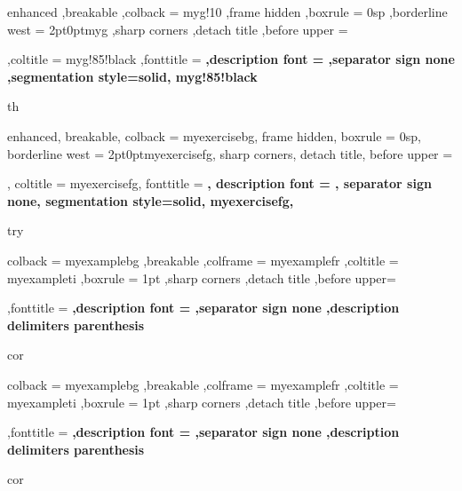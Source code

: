 
{%
	enhanced
	,breakable
	,colback = myg!10
	,frame hidden
	,boxrule = 0sp
	,borderline west = {2pt}{0pt}{myg}
	,sharp corners
	,detach title
	,before upper = \tcbtitle \par \smallskip
	,coltitle = myg!85!black
	,fonttitle = \bfseries \sffamily
	,description font = \mdseries
	,separator sign none
	,segmentation style={solid, myg!85!black}
}
{th}





{%
	enhanced,
	breakable,
	colback = myexercisebg,
	frame hidden,
	boxrule = 0sp,
	borderline west = {2pt}{0pt}{myexercisefg},
	sharp corners,
	detach title,
	before upper = \tcbtitle \par \smallskip,
	coltitle = myexercisefg,
	fonttitle = \bfseries \sffamily,
	description font = \mdseries,
	separator sign none,
	segmentation style={solid, myexercisefg},
}
{try}


 {%
 	colback = myexamplebg
 	,breakable
 	,colframe = myexamplefr
 	,coltitle = myexampleti
 	,boxrule = 1pt
 	,sharp corners
 	,detach title
 	,before upper=\tcbtitle \par \smallskip
 	,fonttitle = \bfseries
 	,description font = \mdseries
 	,separator sign none
 	,description delimiters parenthesis
 }
 {cor}

{%
	colback = myexamplebg
	,breakable
	,colframe = myexamplefr
	,coltitle = myexampleti
	,boxrule = 1pt
	,sharp corners
	,detach title
	,before upper=\tcbtitle \par \smallskip
	,fonttitle = \bfseries
	,description font = \mdseries
	,separator sign none
	,description delimiters parenthesis
}
{cor}


